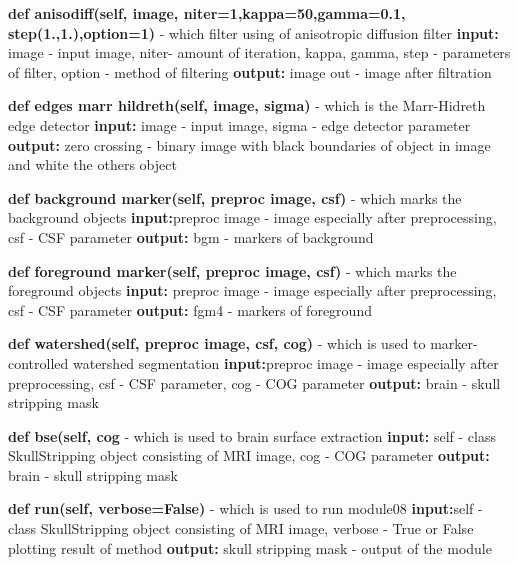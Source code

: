 \begin{itemize}
{    \item {\textbf{def anisodiff(self, image, niter=1,kappa=50,gamma=0.1, step(1.,1.),option=1)} - which filter using of anisotropic diffusion filter \textbf{input:} image - input image, niter- amount of iteration, kappa, gamma, step - parameters of filter, option - method of filtering  \textbf{output:} image out - image after filtration}
    \item {\textbf{def edges marr hildreth(self, image, sigma)} - which is the Marr-Hidreth edge detector \textbf{input:} image - input image, sigma - edge detector parameter \textbf{output:} zero crossing - binary image with black boundaries of object in image and white the others object}
    \item {\textbf{def background marker(self, preproc image, csf)} - which marks the background objects \textbf{input:}preproc image - image especially after preprocessing, csf - CSF parameter \textbf{output:} bgm - markers of background}
    \item {\textbf{def foreground marker(self, preproc image, csf)} - which marks the foreground objects \textbf{input:} preproc image - image especially after preprocessing, csf - CSF parameter \textbf{output:} fgm4 - markers of foreground}
    \item {\textbf{def watershed(self, preproc image, csf, cog)} - which is used to marker-controlled watershed segmentation \textbf{input:}preproc image - image especially after preprocessing, csf - CSF parameter, cog - COG parameter \textbf{output:} brain - skull stripping mask}
    \item {\textbf{def bse(self, cog} - which is used to brain surface extraction \textbf{input:} self - class SkullStripping object consisting of MRI image, cog - COG parameter \textbf{output:} brain - skull stripping mask}
    \item {\textbf{def run(self, verbose=False)} - which is used to run module08 \textbf{input:}self - class SkullStripping object consisting of MRI image, verbose - True or False plotting result of method \textbf{output:} skull stripping mask - output of the module}}
\end{itemize}

